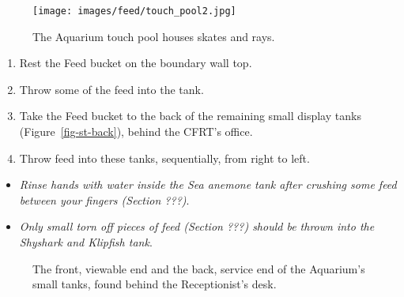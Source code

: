 \documentclass[
  letterpaper,
  DIV=11,
  numbers=noendperiod]{scrreprt}
\providecommand{\tightlist}{%
  \setlength{\itemsep}{0pt}\setlength{\parskip}{0pt}}\usepackage{longtable,booktabs,array}
\begin{document}
\begin{figure}[H]

{\centering \texttt{[image: images/feed/touch\_pool2.jpg]}

}

\caption{\label{fig-touch-pool}The Aquarium touch pool houses skates and
rays.}

\end{figure}

\begin{enumerate}
\def\labelenumi{\arabic{enumi}.}
\setcounter{enumi}{16}
\tightlist
\item
  Rest the Feed bucket on the boundary wall top.
\item
  Throw some of the feed into the tank.
\item
  Take the Feed bucket to the back of the remaining small display tanks
  (Figure~\ref{fig-st-back}), behind the CFRT's office.
\item
  Throw feed into these tanks, sequentially, from right to left.
\end{enumerate}

\begin{itemize}
\tightlist
\item
  \emph{Rinse hands with water inside the Sea anemone tank after
  crushing some feed between your fingers (Section ???)}.
\item
  \emph{Only small torn off pieces of feed (Section ???) should be
  thrown into the Shyshark and Klipfish tank}.
\end{itemize}

\begin{figure}[H]

\begin{minipage}[t]{0.50\linewidth}

{\centering 


}

\end{minipage}%
%
\begin{minipage}[t]{0.50\linewidth}

{\centering 


}

\end{minipage}%

\caption{\label{fig-small-tanks}The front, viewable end and the back,
service end of the Aquarium's small tanks, found behind the
Receptionist's desk.}

\end{figure}
\end{document}
